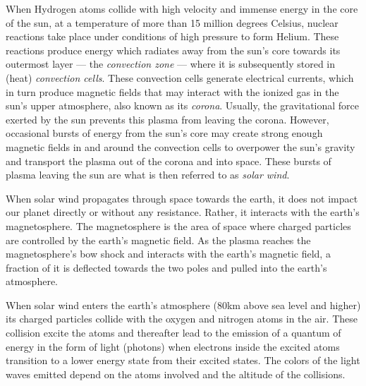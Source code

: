 When Hydrogen atoms collide with high velocity and immense energy in the core of the sun, at a temperature of more than 15 million degrees Celsius, nuclear reactions take place under conditions of high pressure to form Helium. These reactions produce energy which radiates away from the sun's core towards its outermost layer --- the \emph{convection zone} --- where it is subsequently stored in (heat) \emph{convection cells}. These convection cells generate electrical currents, which in turn produce magnetic fields that may interact with the ionized gas in the sun's upper atmosphere, also known as its \emph{corona}. Usually, the gravitational force exerted by the sun
prevents this plasma from leaving the corona. However, occasional bursts of energy from the sun’s core may create strong enough magnetic fields in and around the convection cells to overpower the sun’s gravity and transport the plasma out of the corona and into space. These bursts of plasma leaving the sun are what is then referred to as \emph{solar wind}. 

When solar wind propagates through space towards the earth, it does not impact our planet directly or without any resistance. Rather, it interacts with the earth’s magnetosphere. The magnetosphere is the area of space where charged particles are controlled by the earth’s magnetic field. As the plasma reaches the magnetosphere's bow shock and interacts with the earth's magnetic field, a fraction of it is deflected towards the two poles and pulled into the earth’s atmosphere.


When solar wind enters the earth’s atmosphere (80km above sea level and higher) its charged particles collide with the oxygen and nitrogen atoms in the air. These collision excite the atoms and thereafter lead to the emission of a quantum of energy in the form of light (photons) when electrons inside the excited atoms transition to a lower energy state from their excited states. The colors of the light waves emitted depend on the atoms involved and the altitude of the collisions.

